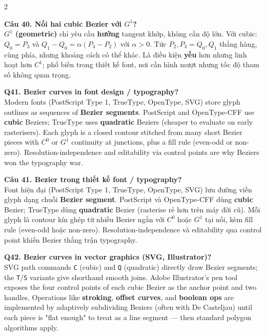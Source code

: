 \begin{paracol}{2}
\switchcolumn

\textbf{Câu 40. Nối hai cubic Bezier với $G^1$?}\\
\textbf{$G^1$ (geometric)} chỉ yêu cầu \textbf{hướng} tangent khớp, không cần độ lớn. Với cubic: $Q_0=P_3$ và $Q_1-Q_0 = \alpha (P_3-P_2)$ với $\alpha > 0$. Tức $P_2, P_3=Q_0, Q_1$ thẳng hàng, cùng phía, nhưng khoảng cách có thể khác. Là điều kiện \textbf{yếu} hơn nhưng linh hoạt hơn $C^1$; phổ biến trong thiết kế font, nơi cần hình mượt nhưng tốc độ tham số không quan trọng.

\switchcolumn*

\textbf{Q41. Bezier curves in font design / typography?}\\
Modern fonts (PostScript Type 1, TrueType, OpenType, SVG) store glyph outlines as sequences of \textbf{Bezier segments}. PostScript and OpenType-CFF use \textbf{cubic} Beziers; TrueType uses \textbf{quadratic} Beziers (cheaper to evaluate on early rasterisers). Each glyph is a closed contour stitched from many short Bezier pieces with $C^0$ or $G^1$ continuity at junctions, plus a fill rule (even-odd or non-zero). Resolution-independence and editability via control points are why Beziers won the typography war.

\switchcolumn

\textbf{Câu 41. Bezier trong thiết kế font / typography?}\\
Font hiện đại (PostScript Type 1, TrueType, OpenType, SVG) lưu đường viền glyph dạng chuỗi \textbf{Bezier segment}. PostScript và OpenType-CFF dùng \textbf{cubic} Bezier; TrueType dùng \textbf{quadratic} Bezier (rasterise rẻ hơn trên máy đời cũ). Mỗi glyph là contour kín ghép từ nhiều Bezier ngắn với $C^0$ hoặc $G^1$ tại nối, kèm fill rule (even-odd hoặc non-zero). Resolution-independence và editability qua control point khiến Bezier thắng trận typography.

\switchcolumn*

\textbf{Q42. Bezier curves in vector graphics (SVG, Illustrator)?}\\
SVG path commands \texttt{C} (cubic) and \texttt{Q} (quadratic) directly draw Bezier segments; the \texttt{T}/\texttt{S} variants give shorthand smooth joins. Adobe Illustrator's pen tool exposes the four control points of each cubic Bezier as the anchor point and two handles. Operations like \textbf{stroking}, \textbf{offset curves}, and \textbf{boolean ops} are implemented by adaptively subdividing Beziers (often with De Casteljau) until each piece is "flat enough" to treat as a line segment — then standard polygon algorithms apply.


\end{paracol}
